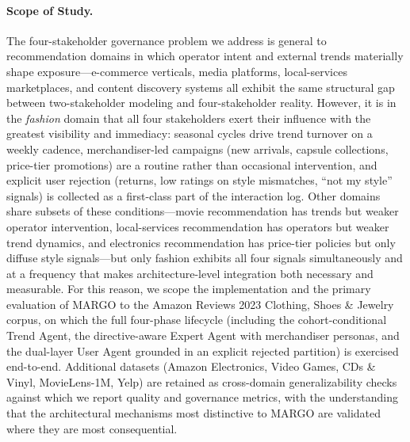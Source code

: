 \documentclass[master,english,final]{postech-ucs}
\begin{document}
\paragraph{Scope of Study.}
The four-stakeholder governance problem we address is general to recommendation domains in which operator intent and external trends materially shape exposure---e-commerce verticals, media platforms, local-services marketplaces, and content discovery systems all exhibit the same structural gap between two-stakeholder modeling and four-stakeholder reality.
However, it is in the \emph{fashion} domain that all four stakeholders exert their influence with the greatest visibility and immediacy: seasonal cycles drive trend turnover on a weekly cadence, merchandiser-led campaigns (new arrivals, capsule collections, price-tier promotions) are a routine rather than occasional intervention, and explicit user rejection (returns, low ratings on style mismatches, ``not my style'' signals) is collected as a first-class part of the interaction log.
Other domains share subsets of these conditions---movie recommendation has trends but weaker operator intervention, local-services recommendation has operators but weaker trend dynamics, and electronics recommendation has price-tier policies but only diffuse style signals---but only fashion exhibits all four signals simultaneously and at a frequency that makes architecture-level integration both necessary and measurable.
For this reason, we scope the implementation and the primary evaluation of MARGO to the Amazon Reviews 2023 Clothing, Shoes \& Jewelry corpus, on which the full four-phase lifecycle (including the cohort-conditional Trend Agent, the directive-aware Expert Agent with merchandiser personas, and the dual-layer User Agent grounded in an explicit rejected partition) is exercised end-to-end.
Additional datasets (Amazon Electronics, Video Games, CDs \& Vinyl, MovieLens-1M, Yelp) are retained as cross-domain generalizability checks against which we report quality and governance metrics, with the understanding that the architectural mechanisms most distinctive to MARGO are validated where they are most consequential.
\end{document}

